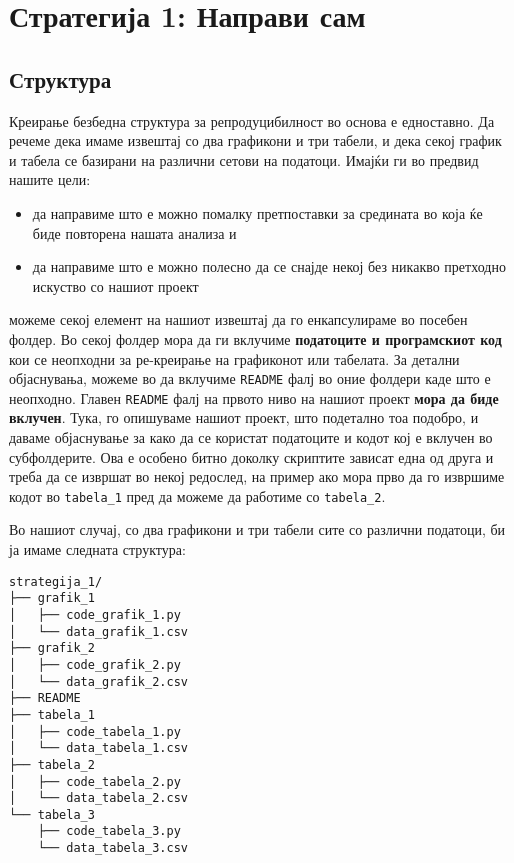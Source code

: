\documentclass[
]{book}
\providecommand{\tightlist}{%
  \setlength{\itemsep}{0pt}\setlength{\parskip}{0pt}}
\begin{document}
\hypertarget{ux441ux442ux440ux430ux442ux435ux433ux438ux458ux430-1-ux43dux430ux43fux440ux430ux432ux438-ux441ux430ux43c}{%
\section{Стратегија 1: Направи сам}\label{ux441ux442ux440ux430ux442ux435ux433ux438ux458ux430-1-ux43dux430ux43fux440ux430ux432ux438-ux441ux430ux43c}}

\hypertarget{ux441ux442ux440ux443ux43aux442ux443ux440ux430}{%
\subsection{Структура}\label{ux441ux442ux440ux443ux43aux442ux443ux440ux430}}

Креирање безбедна структура за репродуцибилност во основа е едноставно. Да речеме дека имаме извештај со два графикони и три табели, и дека секој график и табела се базирани на различни сетови на податоци. Имајќи ги во предвид нашите цели:

\begin{itemize}
\tightlist
\item
  да направиме што е можно помалку претпоставки за средината во која ќе биде повторена нашата анализа и\\
\item
  да направиме што е можно полесно да се снајде некој без никакво претходно искуство со нашиот проект
\end{itemize}

можеме секој елемент на нашиот извештај да го енкапсулираме во посебен фолдер. Во секој фолдер мора да ги вклучиме \textbf{податоците и програмскиот код} кои се неопходни за ре-креирање на графиконот или табелата. За детални објаснувања, можеме во да вклучиме \texttt{README} фалј во оние фолдери каде што е неопходно. Главен \texttt{README} фалј на првото ниво на нашиот проект \textbf{мора да биде вклучен}. Тука, го опишуваме нашиот проект, што подетално тоа подобро, и даваме објаснување за како да се користат податоците и кодот кој е вклучен во субфолдерите. Ова е особено битно доколку скриптите зависат една од друга и треба да се извршат во некој редослед, на пример ако мора прво да го извршиме кодот во \texttt{tabela\_1} пред да можеме да работиме со \texttt{tabela\_2}.

Во нашиот случај, со два графикони и три табели сите со различни податоци, би ја имаме следната структура:

\begin{verbatim}
strategija_1/
├── grafik_1
│   ├── code_grafik_1.py
│   └── data_grafik_1.csv
├── grafik_2
│   ├── code_grafik_2.py
│   └── data_grafik_2.csv
├── README
├── tabela_1
│   ├── code_tabela_1.py
│   └── data_tabela_1.csv
├── tabela_2
│   ├── code_tabela_2.py
│   └── data_tabela_2.csv
└── tabela_3
    ├── code_tabela_3.py
    └── data_tabela_3.csv
\end{verbatim}
\end{document}

